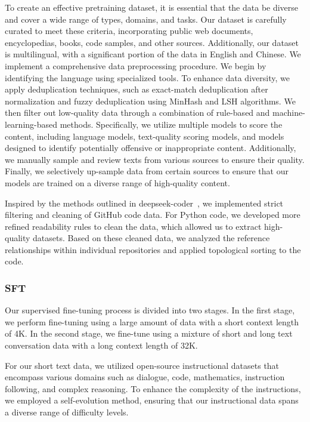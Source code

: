 To create an effective pretraining dataset, it is essential that the data be diverse and cover a wide range of types, domains, and tasks. Our dataset is carefully curated to meet these criteria, incorporating public web documents, encyclopedias, books, code samples, and other sources. Additionally, our dataset is multilingual, with a significant portion of the data in English and Chinese.
We implement a comprehensive data preprocessing procedure. We begin by identifying the language using specialized tools. To enhance data diversity, we apply deduplication techniques, such as exact-match deduplication after normalization and fuzzy deduplication using MinHash and LSH algorithms. We then filter out low-quality data through a combination of rule-based and machine-learning-based methods. Specifically, we utilize multiple models to score the content, including language models, text-quality scoring models, and models designed to identify potentially offensive or inappropriate content. Additionally, we manually sample and review texts from various sources to ensure their quality. Finally, we selectively up-sample data from certain sources to ensure that our models are trained on a diverse range of high-quality content.

Inspired by the methods outlined in deepseek-coder~\cite{guo2024deepseek}, we implemented strict filtering and cleaning of GitHub code data. For Python code, we developed more refined readability rules to clean the data, which allowed us to extract high-quality datasets. Based on these cleaned data, we analyzed the reference relationships within individual repositories and applied topological sorting to the code.

\subsubsection{SFT}

Our supervised fine-tuning process is divided into two stages. In the first stage, we perform fine-tuning using a large amount of data with a short context length of 4K. In the second stage, we fine-tune using a mixture of short and long text conversation data with a long context length of 32K.

For our short text data, we utilized open-source instructional datasets that encompass various domains such as dialogue, code, mathematics, instruction following, and complex reasoning. To enhance the complexity of the instructions, we employed a self-evolution method, ensuring that our instructional data spans a diverse range of difficulty levels. 

